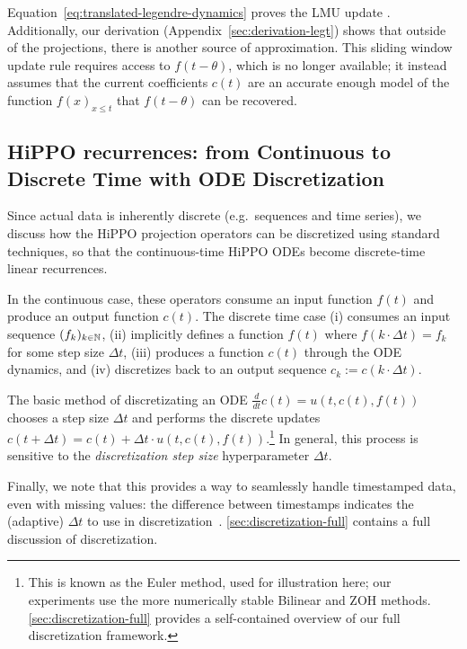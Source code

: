 Equation~\eqref{eq:translated-legendre-dynamics} proves the LMU update \citep[equation (1)]{voelker2019legendre}.
Additionally, our derivation (Appendix~\ref{sec:derivation-legt}) shows that outside of the projections,
there is another source of approximation.
This sliding window update rule requires access to $f(t-\theta)$, which is no longer available;
it instead assumes that the current coefficients $c(t)$ are an accurate enough model of the function $f(x)_{x \le t}$ that $f(t-\theta)$ can be recovered.





\subsection{HiPPO recurrences: from Continuous to Discrete Time with ODE Discretization}
\label{sec:discretization}

Since actual data is inherently discrete (e.g.\ sequences and time series),
we discuss how the HiPPO projection operators can be discretized using standard techniques,
so that the continuous-time HiPPO ODEs become discrete-time linear recurrences.





In the continuous case, these operators consume an input function $f(t)$ and produce an output function $c(t)$.
The discrete time case (i) consumes an input sequence $(f_k)_{k \in \mathbb{N}}$, %
(ii) implicitly defines a function $f(t)$ where $f(k \cdot \Delta t) = f_k$ for some step
size $\Delta t$, (iii) produces a function $c(t)$ through the ODE dynamics,
and (iv) discretizes back to an output sequence $c_k := c(k \cdot \Delta t)$.


The basic method of discretizating an ODE $\frac{d}{dt} c(t) = u(t, c(t), f(t))$ chooses a step size $\Delta t$ and performs the discrete updates
$c(t+\Delta t) = c(t) + \Delta t \cdot u(t, c(t), f(t))$.\footnote{This is known as the Euler method, used for illustration here; our experiments use the more numerically stable Bilinear and ZOH methods.
\cref{sec:discretization-full} provides a self-contained overview of our full discretization framework.}
In general, this process is sensitive to the \emph{discretization step size} hyperparameter $\Delta t$.

Finally, we note that this provides a way to seamlessly handle timestamped data, even with missing values:
the difference between timestamps indicates the (adaptive) $\Delta t$ to use in discretization~\citep{chen2018neural}.
\cref{sec:discretization-full} contains a full discussion of discretization.




